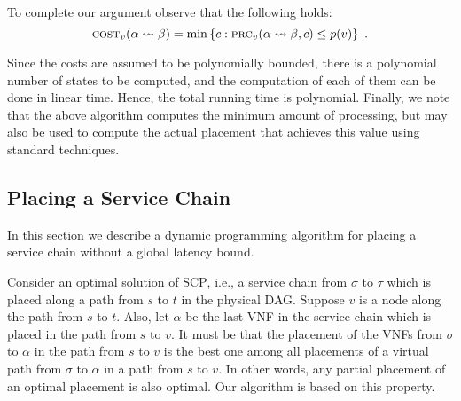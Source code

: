 \documentclass[runningheads]{llncs}
\newcommand{\set}[1]{\left\{ #1 \right\}}
\newcommand{\scp}{\textsc{SCP}\xspace}
\newcommand{\cost}{\textsc{cost}\xspace}
\newcommand{\process}{\textsc{prc}\xspace}
\begin{document}
To complete our argument observe that the following holds:
\[
\cost_v(\alpha \leadsto \beta)
= \min \set{c : \process_v(\alpha \leadsto \beta, c) \leq p(v)}
~.
\]

Since the costs are assumed to be polynomially bounded, there is a
polynomial number of states to be computed, and the computation of
each of them can be done in linear time.  Hence, the total running
time is polynomial.  Finally, we note that the above algorithm
computes the minimum amount of processing, but may also be used to
compute the actual placement that achieves this value using standard
techniques.


\subsection{Placing a Service Chain}

In this section we describe a dynamic programming algorithm for
placing a service chain without a global latency bound.  

Consider an optimal solution of \scp, i.e., a service chain from
$\sigma$ to $\tau$ which is placed along a path from $s$ to $t$ in the
physical DAG.  Suppose $v$ is a node along the path from $s$ to $t$.
Also, let $\alpha$ be the last VNF in the service chain which is
placed in the path from $s$ to $v$.  It must be that the placement of
the VNFs from $\sigma$ to $\alpha$ in the path from $s$ to $v$ is the
best one among all placements of a virtual path from $\sigma$ to
$\alpha$ in a path from $s$ to $v$.  In other words, any partial
placement of an optimal placement is also optimal.  Our algorithm is
based on this property.
\end{document}
